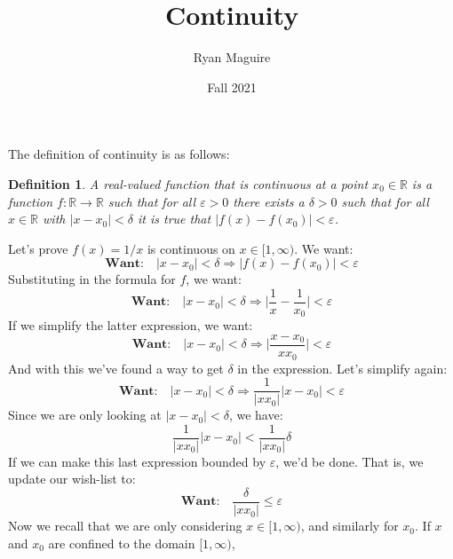 \documentclass{article}
\title{Continuity}
\author{Ryan Maguire}
\date{Fall 2021}
\theoremstyle{normal}
\newtheorem{definition}{Definition}
\begin{document}
    \maketitle
    The definition of continuity is as follows:
    \begin{definition}
        A real-valued function that is continuous at a point
        $x_{0}\in\mathbb{R}$ is a function $f:\mathbb{R}\rightarrow\mathbb{R}$
        such that for all $\varepsilon>0$ there exists a $\delta>0$ such that
        for all $x\in\mathbb{R}$ with $|x-x_{0}|<\delta$ it is true that
        $|f(x)-f(x_{0})|<\varepsilon$.
    \end{definition}
    Let's prove $f(x)=1/x$ is continuous on $x\in[1,\infty)$. We want:
    \begin{equation}
        \textbf{Want:}\quad
        |x-x_{0}|<\delta
        \Rightarrow|f(x)-f(x_{0})|<\varepsilon
    \end{equation}
    Substituting in the formula for $f$, we want:
    \begin{equation}
        \textbf{Want:}\quad
        |x-x_{0}|<\delta
        \Rightarrow
        \big|\frac{1}{x}-\frac{1}{x_{0}}\big|<\varepsilon
    \end{equation}
    If we simplify the latter expression, we want:
    \begin{equation}
        \textbf{Want:}\quad
        |x-x_{0}|<\delta
        \Rightarrow
        \big|\frac{x-x_{0}}{xx_{0}}\big|<\varepsilon
    \end{equation}
    And with this we've found a way to get $\delta$ in the expression. Let's
    simplify again:
    \begin{equation}
        \textbf{Want:}\quad
        |x-x_{0}|<\delta
        \Rightarrow
        \frac{1}{|xx_{0}|}|x-x_{0}|<\varepsilon
    \end{equation}
    Since we are only looking at $|x-x_{0}|<\delta$, we have:
    \begin{equation}
        \frac{1}{|xx_{0}|}|x-x_{0}|<\frac{1}{|xx_{0}|}\delta
    \end{equation}
    If we can make this last expression bounded by $\varepsilon$, we'd be done.
    That is, we update our wish-list to:
    \begin{equation}
        \textbf{Want:}\quad
        \frac{\delta}{|xx_{0}|}\leq\varepsilon
    \end{equation}
    Now we recall that we are only considering $x\in[1,\infty)$, and similarly
    for $x_{0}$. If $x$ and $x_{0}$ are confined to the domain $[1,\infty)$,
\end{document}
